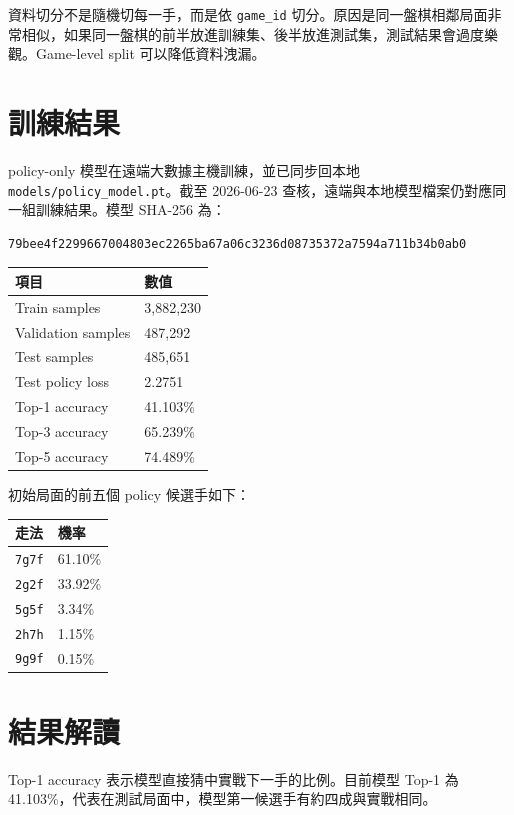 \documentclass[12pt,a4paper,fontset=none]{ctexart}
\begin{document}
資料切分不是隨機切每一手，而是依 \texttt{game\_id} 切分。原因是同一盤棋相鄰局面非常相似，如果同一盤棋的前半放進訓練集、後半放進測試集，測試結果會過度樂觀。Game-level split 可以降低資料洩漏。

\section{訓練結果}

policy-only 模型在遠端大數據主機訓練，並已同步回本地 \texttt{models/policy\_model.pt}。截至 2026-06-23 查核，遠端與本地模型檔案仍對應同一組訓練結果。模型 SHA-256 為：

\begin{lstlisting}[style=cmd]
79bee4f2299667004803ec2265ba67a06c3236d08735372a7594a711b34b0ab0
\end{lstlisting}

\begin{longtable}{p{}p{}}
\toprule
\textbf{項目} & \textbf{數值}\\
\midrule
\endhead
Train samples & 3,882,230\\
Validation samples & 487,292\\
Test samples & 485,651\\
Test policy loss & 2.2751\\
Top-1 accuracy & 41.103\%\\
Top-3 accuracy & 65.239\%\\
Top-5 accuracy & 74.489\%\\
\bottomrule
\end{longtable}

初始局面的前五個 policy 候選手如下：

\begin{longtable}{p{}p{}}
\toprule
\textbf{走法} & \textbf{機率}\\
\midrule
\endhead
\texttt{7g7f} & 61.10\%\\
\texttt{2g2f} & 33.92\%\\
\texttt{5g5f} & 3.34\%\\
\texttt{2h7h} & 1.15\%\\
\texttt{9g9f} & 0.15\%\\
\bottomrule
\end{longtable}

\section{結果解讀}

Top-1 accuracy 表示模型直接猜中實戰下一手的比例。目前模型 Top-1 為 41.103\%，代表在測試局面中，模型第一候選手有約四成與實戰相同。
\end{document}
